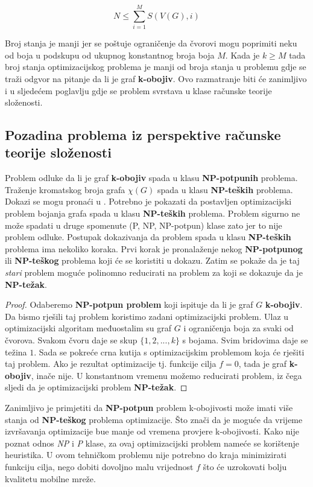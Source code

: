 \documentclass[times, utf8, diplomski, numeric]{fer}
\begin{document}
\begin{equation}
N \le \sum_{i=1}^{M} S(V(G), i)
\end{equation}

Broj stanja je manji jer se poštuje ograničenje da čvorovi mogu poprimiti neku od boja u podskupu od ukupnog konstantnog broja boja $M$. Kada je $k\ge M$ tada broj stanja optimizacijskog problema je manji od broja stanja u problemu gdje se traži odgvor na pitanje da li je graf \textbf{k-obojiv}. Ovo razmatranje biti će zanimljivo i u sljedećem poglavlju gdje se problem svrstava u klase računske teorije složenosti.

\subsection{Pozadina problema iz perspektive računske teorije složenosti}

Problem odluke da li je graf \textbf{k-obojiv} spada u klasu \textbf{NP-potpunih} problema. Traženje kromatskog broja grafa $\chi(G)$ spada u klasu \textbf{NP-teških} problema. Dokazi se mogu pronaći u \cite{Garey:1974:SNP:800119.803884}. Potrebno je pokazati da postavljen optimizacijski problem bojanja grafa spada u klasu \textbf{NP-teških} problema. Problem sigurno ne može spadati u druge spomenute (P, NP, NP-potpun) klase zato jer to nije problem odluke.
Postupak dokazivanja da problem spada u klasu \textbf{NP-teških} problema ima nekoliko koraka. Prvi korak je pronalaženje nekog \textbf{NP-potpunog} ili \textbf{NP-teškog} problema koji će se koristiti u dokazu. Zatim se pokaže da je taj \emph{stari} problem moguće polinomno reducirati na problem za koji se dokazuje da je \textbf{NP-težak}. 

\begin{proof}
Odaberemo \textbf{NP-potpun problem} koji ispituje da li je graf $G$ \textbf{k-obojiv}. Da bismo rješili taj problem koristimo zadani optimizacijski problem. Ulaz u optimizacijski algoritam međuostalim su graf $G$ i ograničenja boja za svaki od čvorova. Svakom čvoru daje se skup $\{1,2,...,k\}$ s bojama. Svim bridovima daje se težina $1$. Sada se pokreće crna kutija s optimizacijskim problemom koja će rješiti taj problem. Ako je rezultat optimizacije tj. funkcije cilja $f=0$, tada je graf \textbf{k-obojiv}, inače nije. U konstantnom vremenu možemo reducirati problem, iz čega sljedi da je optimizacijski problem \textbf{NP-težak}.  
\end{proof}

Zanimljivo je primjetiti da \textbf{NP-potpun} problem k-obojivosti može imati više stanja od \textbf{NP-teškog} problema optimizacije. Što znači da je moguće da vrijeme izvršavanja optimizacije bue manje od vremena provjere k-obojivosti. Kako nije poznat odnos \emph{NP} i \emph{P} klase, za ovaj optimizacijski problem nameće se korištenje heuristika. U ovom tehničkom problemu nije potrebno do kraja minimizirati funkciju cilja, nego dobiti dovoljno malu vrijednost $f$ što će uzrokovati bolju kvalitetu mobilne mreže. 
\end{document}
